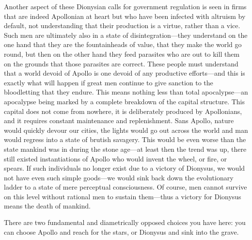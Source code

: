 \documentclass[11pt]{article}
\begin{document}
Another aspect of these Dionysian calls for government regulation is seen in firms that are indeed Apollonian at heart but who have been infected with altruism by default, not understanding that their production is a virtue, rather than a vice. Such men are ultimately also in a state of disintegration---they understand on the one hand that they are the fountainheads of value, that they make the world go round, but then on the other hand they feed parasites who are out to kill them on the grounds that those parasites are correct. These people must understand that a world devoid of Apollo is one devoid of any productive efforts---and this is exactly what will happen if great men continue to give sanction to the bloodletting that they endure. This means nothing less than total apocalypse---an apocalypse being marked by a complete breakdown of the capital structure. This capital does not come from nowhere, it is deliberately produced by Apollonians, and it requires constant maintenance and replenishment. Sans Apollo, nature would quickly devour our cities, the lights would go out across the world and man would regress into a state of brutish savagery. This would be even worse than the state mankind was in during the stone age---at least then the trend was up, there still existed instantiations of Apollo who would invent the wheel, or fire, or spears. If such individuals no longer exist due to a victory of Dionysus, we would not have even such simple goods---we would sink back down the evolutionary ladder to a state of mere perceptual consciousness. Of course, men cannot survive on this level without rational men to sustain them---thus a victory for Dionysus means the death of mankind.

There are two fundamental and diametrically opposed choices you have here: you can choose Apollo and reach for the stars, or Dionysus and sink into the grave.
\end{document}
